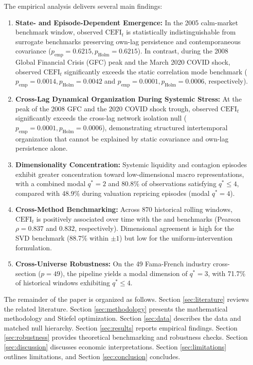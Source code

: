 \documentclass[review,12pt,authoryear]{elsarticle}
\begin{document}
The empirical analysis delivers several main findings:
\begin{enumerate}
    \item \textbf{State- and Episode-Dependent Emergence:} In the 2005 calm-market benchmark window, observed $\mathrm{CEFI}_t$ is statistically indistinguishable from surrogate benchmarks preserving own-lag persistence and contemporaneous covariance ($p_{\text{emp}} = 0.6215, p_{\text{Holm}} = 0.6215$). In contrast, during the 2008 Global Financial Crisis (GFC) peak and the March 2020 COVID shock, observed $\mathrm{CEFI}_t$ significantly exceeds the static correlation mode benchmark ($p_{\text{emp}} = 0.0014, p_{\text{Holm}} = 0.0042$ and $p_{\text{emp}} = 0.0001, p_{\text{Holm}} = 0.0006$, respectively).
    \item \textbf{Cross-Lag Dynamical Organization During Systemic Stress:} At the peak of the 2008 GFC and the 2020 COVID shock trough, observed $\mathrm{CEFI}_t$ significantly exceeds the cross-lag network isolation null ($p_{\text{emp}} = 0.0001, p_{\text{Holm}} = 0.0006$), demonstrating structured intertemporal organization that cannot be explained by static covariance and own-lag persistence alone.
    \item \textbf{Dimensionality Concentration:} Systemic liquidity and contagion episodes exhibit greater concentration toward low-dimensional macro representations, with a combined modal $q^*=2$ and 80.8\% of observations satisfying $q^* \le 4$, compared with 48.9\% during valuation repricing episodes (modal $q^*=4$).
    \item \textbf{Cross-Method Benchmarking:} Across 870 historical rolling windows, $\mathrm{CEFI}_t$ is positively associated over time with the \citet{liu2024exact} and \citet{liu2025singular} benchmarks (Pearson $\rho = 0.837$ and $0.832$, respectively). Dimensional agreement is high for the SVD benchmark (88.7\% within $\pm 1$) but low for the uniform-intervention formulation.
    \item \textbf{Cross-Universe Robustness:} On the 49 Fama-French industry cross-section ($p=49$), the pipeline yields a modal dimension of $q^* = 3$, with 71.7\% of historical windows exhibiting $q^* \le 4$.
\end{enumerate}

The remainder of the paper is organized as follows. Section \ref{sec:literature} reviews the related literature. Section \ref{sec:methodology} presents the mathematical methodology and Stiefel optimization. Section \ref{sec:data} describes the data and matched null hierarchy. Section \ref{sec:results} reports empirical findings. Section \ref{sec:robustness} provides theoretical benchmarking and robustness checks. Section \ref{sec:discussion} discusses economic interpretations. Section \ref{sec:limitations} outlines limitations, and Section \ref{sec:conclusion} concludes.
\end{document}
